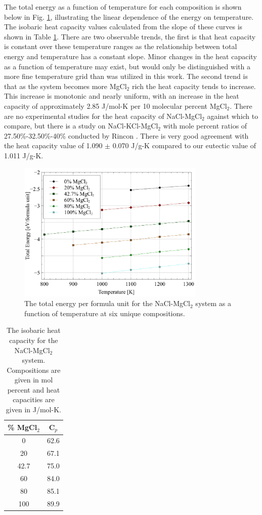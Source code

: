 \documentclass[review]{elsarticle}
\begin{document}
\FloatBarrier

The total energy as a function of temperature for each composition is shown below in Fig. \ref{fig:energy}, illustrating the linear dependence of the energy on temperature. The isobaric heat capacity values calculated from the slope of these curves is shown in Table \ref{table:cp}. There are two observable trends, the first is that heat capacity is constant over these temperature ranges as the relationship between total energy and temperature has a constant slope. Minor changes in the heat capacity as a function of temperature may exist, but would only be distinguished with a more fine temperature grid than was utilized in this work. The second trend is that as the system becomes more MgCl$_2$ rich the heat capacity tends to increase. This increase is monotonic and nearly uniform, with an increase in the heat capacity of approximately 2.85 J/mol-K per 10 molecular percent MgCl$_2$. There are no experimental studies for the heat capacity of NaCl-MgCl$_2$ against which to compare, but there is a study on NaCl-KCl-MgCl$_2$ with mole percent ratios of 27.50\%-32.50\%-40\% conducted by Rincon \cite{del2020experimental}. There is very good agreement with the heat capacity value of 1.090 $\pm$ 0.070 J/g-K compared to our eutectic value of 1.011 J/g-K.

\begin{figure}[h]
 \centering
 \includegraphics[width=0.8\textwidth]{energy.jpg} 
 \caption{The total energy per formula unit for the NaCl-MgCl$_2$ system as a function of temperature at six unique compositions.}
 \label{fig:energy}
\end{figure}

\begin{table}[h!]
\centering
\caption{The isobaric heat capacity for the NaCl-MgCl$_2$ system. Compositions are given in mol percent and heat capacities are given in J/mol-K.}
\begin{tabular}{|c|c|}
\hline
\% MgCl$_2$ &  C$_p$\\
\hline
0  &  62.6\\
20 &  67.1  \\
42.7  &  75.0  \\
60 &  84.0  \\
80 &  85.1  \\
100 &  89.9  \\
\hline
\end{tabular}
\label{table:cp}
\end{table}
\end{document}

